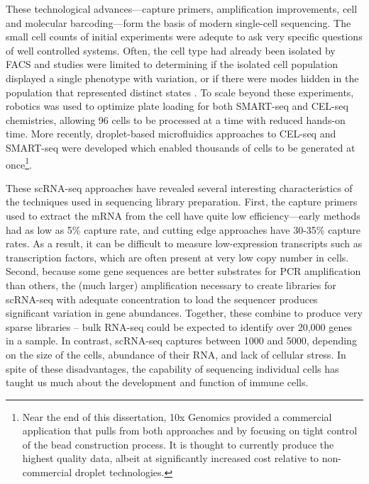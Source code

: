 These technological advances---capture primers, amplification improvements, cell and molecular barcoding---form the basis of modern single-cell sequencing.
The small cell counts of initial experiments were adequte to ask very specific questions of well controlled systems. 
Often, the cell type had already been isolated by FACS and studies were limited to determining if the isolated cell population displayed a single phenotype with variation, or if there were modes hidden in the population that represented distinct states \citep{Shalek2013}.
To scale beyond these experiments, robotics was used to optimize plate loading for both SMART-seq \citep{Shalek2014} and CEL-seq \citep{Jaitin2014} chemistries, allowing 96 cells to be processed at a time with reduced hands-on time. 
More recently, droplet-based microfluidics approaches to CEL-seq \citep{Klein2015} and SMART-seq \citep{Macosko2015} were developed which enabled thousands of cells to be generated at once\footnote{Near the end of this dissertation, 10x Genomics \citep{Zheng2017a} provided a commercial application that pulls from both approaches and by focusing on tight control of the bead construction process. It is thought to currently produce the highest quality data, albeit at significantly increased cost relative to non-commercial droplet technologies.}. 

These scRNA-seq approaches have revealed several interesting characteristics of the techniques used in sequencing library preparation. First, the capture primers used to extract the mRNA from the cell have quite low efficiency---early methods had as low as 5\% capture rate, and cutting edge approaches have 30-35\% capture rates. 
As a result, it can be difficult to measure low-expression transcripts such as transcription factors, which are often present at very low copy number in cells. 
Second, because some gene sequences are better substrates for PCR amplification than others, the (much larger) amplification necessary to create libraries for scRNA-seq with adequate concentration to load the sequencer produces significant variation in gene abundances. 
Together, these combine to produce very sparse libraries -- bulk RNA-seq could be expected to identify over 20,000 genes in a sample. 
In contrast, scRNA-seq captures between 1000 and 5000, depending on the size of the cells, abundance of their RNA, and lack of cellular stress. 
In spite of these disadvantages, the capability of sequencing individual cells has taught us much about the development and function of immune cells. 

